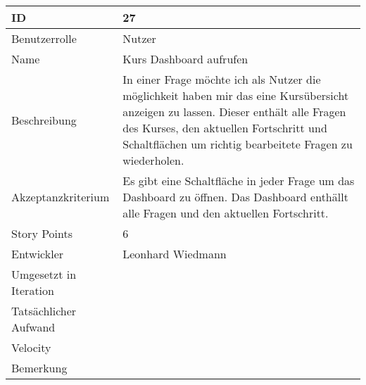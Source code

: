 \begin{tabularx}{\textwidth}{|p{}|X|}
	\hline
	ID & 27 \\
	\hline
	Benutzerrolle & Nutzer \\
	\hline
	Name & Kurs Dashboard aufrufen\\
	\hline
	Beschreibung & In einer Frage möchte ich als Nutzer die möglichkeit haben mir das eine Kursübersicht anzeigen zu lassen.
		Dieser enthält alle Fragen des Kurses, den aktuellen Fortschritt und Schaltflächen um richtig bearbeitete Fragen zu wiederholen. \\
	\hline
	Akzeptanzkriterium & Es gibt eine Schaltfläche in jeder Frage um das Dashboard zu öffnen. Das Dashboard enthällt alle Fragen und den aktuellen Fortschritt. \\
	\hline
	Story Points & 6 \\
	\hline
	Entwickler & Leonhard Wiedmann \\
	\hline
	Umgesetzt in Iteration & \\
	\hline
	Tatsächlicher Aufwand & \\
	\hline
	Velocity & \\
	\hline
	Bemerkung & \\
	\hline
\end{tabularx}
\vspace{20pt}
